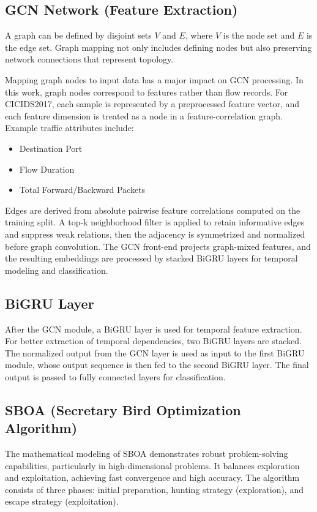 \documentclass[a4paper,fleqn]{cas-sc}
\begin{document}
\subsection{GCN Network (Feature Extraction)}
A graph can be defined by disjoint sets $V$ and $E$, where $V$ is the node set and $E$ is the edge set. Graph mapping not only includes defining nodes but also preserving network connections that represent topology.


Mapping graph nodes to input data has a major impact on GCN processing. In this work, graph nodes correspond to features rather than flow records. For CICIDS2017, each sample is represented by a preprocessed feature vector, and each feature dimension is treated as a node in a feature-correlation graph. Example traffic attributes include:
\begin{itemize}
\item Destination Port
\item Flow Duration
\item Total Forward/Backward Packets
\end{itemize}

Edges are derived from absolute pairwise feature correlations computed on the training split. A top-k neighborhood filter is applied to retain informative edges and suppress weak relations, then the adjacency is symmetrized and normalized before graph convolution. The GCN front-end projects graph-mixed features, and the resulting embeddings are processed by stacked BiGRU layers for temporal modeling and classification.


\subsection{BiGRU Layer}
After the GCN module, a BiGRU layer is used for temporal feature extraction. For better extraction of temporal dependencies, two BiGRU layers are stacked. The normalized output from the GCN layer is used as input to the first BiGRU module, whose output sequence is then fed to the second BiGRU layer. The final output is passed to fully connected layers for classification.


\subsection{SBOA (Secretary Bird Optimization Algorithm)}
The mathematical modeling of SBOA demonstrates robust problem-solving capabilities, particularly in high-dimensional problems. It balances exploration and exploitation, achieving fast convergence and high accuracy. The algorithm consists of three phases: initial preparation, hunting strategy (exploration), and escape strategy (exploitation).
\end{document}
